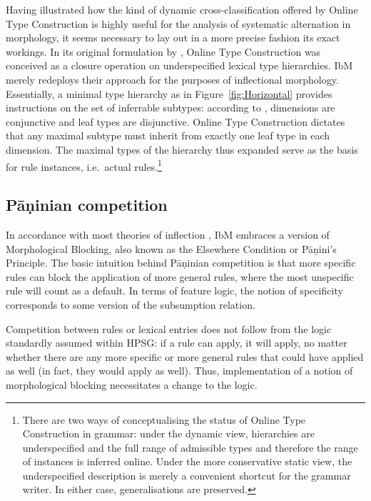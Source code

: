 \documentclass[output=paper
 	        ,biblatex
                ,babelshorthands
                ,newtxmath
                ,draftmode
                ,colorlinks, citecolor=brown
]{langscibook}
\begin{document}
\begin{exe}
\begin{xlist}
\begin{exe}
\begin{xlist}
Having illustrated how the kind of dynamic cross-classification
offered by Online Type Construction is highly useful for the analysis
of systematic alternation in morphology, it seems necessary to lay out
in a more precise fashion its exact workings. In its original
formulation by \citet{Koenig94,Koenig99}, Online Type Construction was conceived as a
closure operation on underspecified lexical type hierarchies. IbM
merely redeploys their approach for the purposes of inflectional
morphology. Essentially, a minimal type hierarchy as in
Figure~\ref{fig:Horizontal} provides instructions on the set of
inferrable subtypes: according to \citet{Koenig94}, dimensions are
conjunctive and leaf types are disjunctive. Online Type Construction
dictates that any maximal subtype must inherit from exactly one leaf
type in each dimension. The maximal types of the hierarchy thus
expanded serve as the basis for rule instances, i.e.\ actual
rules.\footnote{\label{fn:OTC}There are two ways of conceptualising the status of
  Online Type Construction in grammar: under the dynamic view, hierarchies are
  underspecified and the full range of admissible types and therefore
  the range of instances is inferred online. Under the more
  conservative static view, the underspecified description is merely a
  convenient shortcut for the grammar writer. In either case,
  generalisations are preserved.   
   }



\subsection{Pāṇinian competition}
\label{sec:Panini}

In accordance with most theories of inflection
\citep{Prince93,Stump01,Anderson92,Noyer92,kiparsky_p85}, IbM embraces
a version of Morphological Blocking, also known as the Elsewhere Condition
\citep{kiparsky_p85} or Pāṇini's Principle. The basic intuition behind
Pāṇinian competition is that more specific rules can block the
application of more general rules, where the most unspecific rule will
count as a default. In terms of feature logic, the notion of
specificity corresponds to some version of the subsumption relation.

Competition between rules or lexical entries does not follow from the
logic standardly assumed within HPSG: if a rule can apply, it will
apply, no matter whether there are any more specific or more general
rules that could have applied as well (in fact, they would apply as
well). Thus, implementation of a notion of morphological blocking
necessitates a change to the logic.


\end{xlist}
\end{exe}
\end{xlist}
\end{exe}
\end{document}
